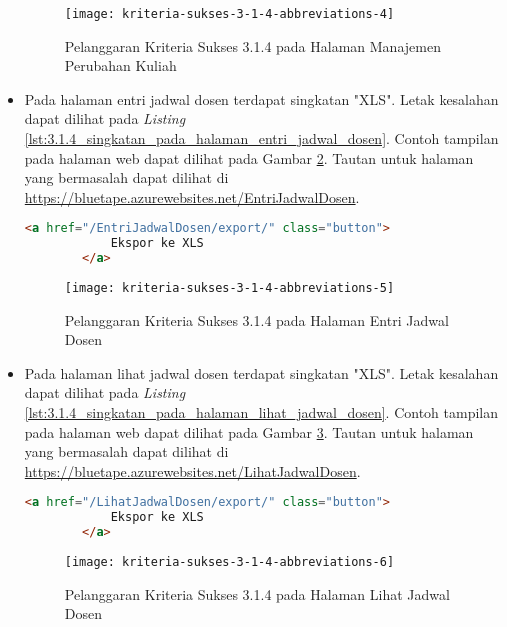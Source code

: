 \begin{itemize}
    \begin{figure}[H]
        \centering  
        \texttt{[image: kriteria-sukses-3-1-4-abbreviations-4]}  
        \caption[Pelanggaran Kriteria Sukses 3.1.4 pada Halaman Manajemen Perubahan Kuliah]{Pelanggaran Kriteria Sukses 3.1.4 pada Halaman Manajemen Perubahan Kuliah}
        \label{fig:3.1.4_abbreviations_4}  
    \end{figure}
    
    \item Pada halaman entri jadwal dosen terdapat singkatan "XLS". Letak kesalahan dapat dilihat pada \textit{Listing} \ref{lst:3.1.4_singkatan_pada_halaman_entri_jadwal_dosen}. Contoh tampilan pada halaman web dapat dilihat pada Gambar \ref{fig:3.1.4_abbreviations_5}. Tautan untuk halaman yang bermasalah dapat dilihat di \url{https://bluetape.azurewebsites.net/EntriJadwalDosen}.
    \begin{lstlisting}[frame=single, label={lst:3.1.4_singkatan_pada_halaman_entri_jadwal_dosen}, language=HTML, caption=Pelanggaran Kriteria Sukses 3.1.4 pada Halaman Entri Jadwal Dosen]
        <a href="/EntriJadwalDosen/export/" class="button">
            Ekspor ke XLS
        </a>
    \end{lstlisting}

    \begin{figure}[H]
        \centering  
        \texttt{[image: kriteria-sukses-3-1-4-abbreviations-5]}  
        \caption[Pelanggaran Kriteria Sukses 3.1.4 pada Halaman Entri Jadwal Dosen]{Pelanggaran Kriteria Sukses 3.1.4 pada Halaman Entri Jadwal Dosen}
        \label{fig:3.1.4_abbreviations_5}  
    \end{figure}
    
    \item Pada halaman lihat jadwal dosen terdapat singkatan "XLS". Letak kesalahan dapat dilihat pada \textit{Listing} \ref{lst:3.1.4_singkatan_pada_halaman_lihat_jadwal_dosen}. Contoh tampilan pada halaman web dapat dilihat pada Gambar \ref{fig:3.1.4_abbreviations_6}. Tautan untuk halaman yang bermasalah dapat dilihat di \url{https://bluetape.azurewebsites.net/LihatJadwalDosen}.
    \begin{lstlisting}[frame=single, label={lst:3.1.4_singkatan_pada_halaman_lihat_jadwal_dosen}, language=HTML, caption=Pelanggaran Kriteria Sukses 3.1.4 pada Halaman Lihat Jadwal Dosen]
        <a href="/LihatJadwalDosen/export/" class="button">
            Ekspor ke XLS
        </a>
    \end{lstlisting}

    \begin{figure}[H]
        \centering  
        \texttt{[image: kriteria-sukses-3-1-4-abbreviations-6]}  
        \caption[Pelanggaran Kriteria Sukses 3.1.4 pada Halaman Lihat Jadwal Dosen]{Pelanggaran Kriteria Sukses 3.1.4 pada Halaman Lihat Jadwal Dosen}
        \label{fig:3.1.4_abbreviations_6}  
    \end{figure}
\end{itemize}

